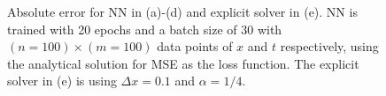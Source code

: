 \begin{figure}
\caption{Absolute error for NN in (a)-(d) and explicit solver in (e). NN is
trained with 20 epochs and a batch size of 30 with $(n=100)\times (m=100)$
data points of $x$
and $t$ respectively, using the analytical solution for MSE as the loss
function. The explicit solver in (e) is using $\Delta x=0.1$ and $\alpha=1/4$.}
\label{fig:abs_error_all}
\end{figure}
